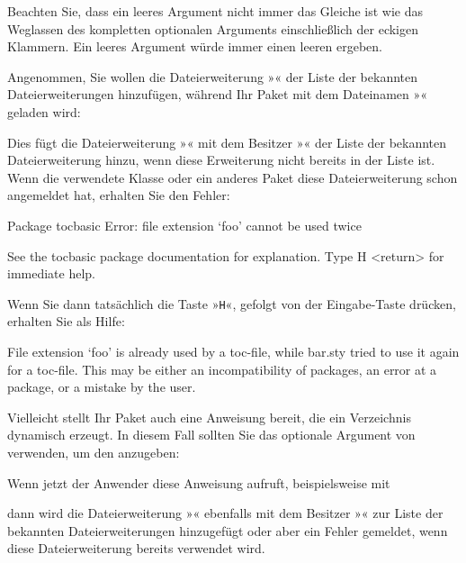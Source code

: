 Beachten Sie, dass ein leeres Argument 
nicht immer das Gleiche ist wie das Weglassen des kompletten optionalen
Arguments einschließlich der eckigen Klammern. Ein leeres Argument würde immer
einen leeren  ergeben.
\begin{Example}
  Angenommen, Sie wollen die Dateierweiterung »« der Liste der
  bekannten Dateierweiterungen hinzufügen, während Ihr Paket mit dem
  Dateinamen »« geladen wird:
\begin{lstcode}
\end{lstcode}
  Dies fügt die Dateierweiterung »« mit dem Besitzer
  »« der Liste der bekannten Dateierweiterung hinzu, wenn diese
  Erweiterung nicht bereits in der Liste ist. Wenn die verwendete
  Klasse oder ein anderes Paket diese Dateierweiterung schon angemeldet hat,
  erhalten Sie den Fehler:
\begin{lstoutput}[breakatwhitespace]
  Package tocbasic Error: file extension `foo' cannot be used twice

  See the tocbasic package documentation for explanation.
  Type H <return> for immediate help.
\end{lstoutput}
  Wenn Sie dann tatsächlich die Taste »\texttt{H}«, gefolgt von der
  Eingabe-Taste drücken, erhalten Sie als Hilfe:
\begin{lstoutput}[breakatwhitespace]
  File extension `foo' is already used by a toc-file, while bar.sty
  tried to use it again for a toc-file.
  This may be either an incompatibility of packages, an error at a package,
  or a mistake by the user.
\end{lstoutput}

  Vielleicht stellt Ihr Paket auch eine Anweisung bereit, die ein
  Verzeichnis dynamisch erzeugt. In diesem Fall sollten Sie das
  optionale Argument von  verwenden, um den
   anzugeben:
\begin{lstcode}
  \newcommand*{\createnewlistofsomething}[1]{%
    \addtotoclist[bar.sty]{#1}%
  }
\end{lstcode}
  Wenn jetzt der Anwender diese Anweisung aufruft, beispielsweise mit
\begin{lstcode}
\end{lstcode}
  dann wird die Dateierweiterung »« ebenfalls mit dem Besitzer
  »« zur Liste der bekannten Dateierweiterungen hinzugefügt
  oder aber ein Fehler gemeldet, wenn diese Dateierweiterung bereits verwendet
  wird.
\end{Example}

